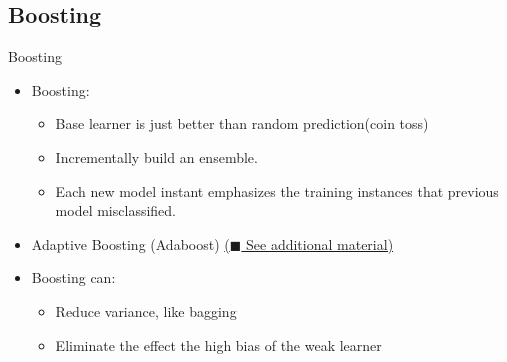 \documentclass[first=dgreen,second=purple,logo=yellowexc]{aaltoslides}
\begin{document}
\subsection{Boosting}

\begin{frame}{Boosting}
\begin{itemize}
    \item Boosting:
    \begin{itemize}
        \item Base learner is just better than random prediction(coin toss)
        \item Incrementally build an ensemble.
        \item Each new model instant emphasizes the training instances that previous model misclassified.
    \end{itemize}
    \item Adaptive Boosting (Adaboost) \href{run:adaboostmh.pdf}{($\blacksquare$ See additional material)} \cite{Freund92,SchSin98}
    \item Boosting can:
    \begin{itemize}
        \item Reduce variance, like bagging
        \item Eliminate the effect the high bias of the weak learner \cite{FreSch96}
    \end{itemize}
\end{itemize}
\end{frame}

\end{document}
